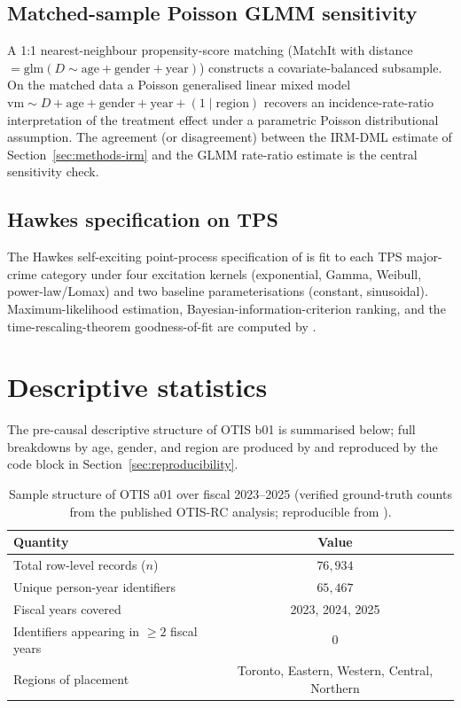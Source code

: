 \documentclass[article,shortnames,nojss]{jss}
\newcommand{\OTIS}{\textsf{OTIS}}
\newcommand{\TPS}{\textsf{TPS}}
\newcommand{\vm}{\ensuremath{\mathrm{vm}}}
\begin{document}
\subsection{Matched-sample Poisson GLMM sensitivity}
\label{sec:methods-matchit}

A 1:1 nearest-neighbour propensity-score matching (MatchIt with
distance $= \mathrm{glm}(D \sim \mathrm{age} + \mathrm{gender} +
\mathrm{year})$) constructs a covariate-balanced subsample. On the
matched data a Poisson generalised linear mixed model
$\vm \sim D + \mathrm{age} + \mathrm{gender} + \mathrm{year} +
(1 \mid \mathrm{region})$ recovers an incidence-rate-ratio
interpretation of the treatment effect under a parametric Poisson
distributional assumption. The agreement (or disagreement) between
the IRM-DML estimate of Section~\ref{sec:methods-irm} and the GLMM
rate-ratio estimate is the central sensitivity check.


\subsection[Hawkes specification on TPS]{Hawkes specification on \TPS{}}
\label{sec:methods-hawkes}

The Hawkes self-exciting point-process specification of
\citet{Ruhela2026Hawkes} is fit to each \TPS{} major-crime category
under four excitation kernels (exponential, Gamma, Weibull,
power-law/Lomax) and two baseline parameterisations (constant,
sinusoidal). Maximum-likelihood estimation, Bayesian-information-criterion
ranking, and the time-rescaling-theorem goodness-of-fit
\citep{BrownEtAl2002} are computed by
.

\section{Descriptive statistics}
\label{sec:descriptives}

The pre-causal descriptive structure of \OTIS{} b01 is summarised
below; full breakdowns by age, gender, and region are produced by
 and reproduced by the code block
in Section~\ref{sec:reproducibility}.

\begin{table}[h]
\centering
\caption{Sample structure of \OTIS{} a01 over fiscal 2023--2025
(verified ground-truth counts from the published OTIS-RC analysis;
reproducible from ).}
\label{tab:otis-counts}
\begin{tabular}{lc}
\toprule
Quantity & Value \\
\midrule
Total row-level records ($n$) & $76{,}934$ \\
Unique person-year identifiers & $65{,}467$ \\
Fiscal years covered & 2023, 2024, 2025 \\
Identifiers appearing in $\ge 2$ fiscal years & $0$ \\
Regions of placement & Toronto, Eastern, Western, Central, Northern \\
\bottomrule
\end{tabular}
\end{table}
\end{document}

